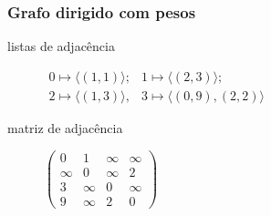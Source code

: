\documentclass{beamer}
\begin{document}
\begin{frame}
\frametitle{Grafo dirigido com pesos}

\begin{center}
\end{center}

\begin{description}

\item[listas de adjacência] $\begin{array}{ll}
  0 \mapsto \langle (1, 1) \rangle; & 1 \mapsto \langle (2, 3) \rangle; \\
  2 \mapsto \langle (1, 3) \rangle, & 3 \mapsto \langle (0, 9), (2, 2) \rangle
  \end{array}$

\item[matriz de adjacência] $\left( 
\begin{array}{cccc}
0 & 1 & \infty & \infty \\
\infty & 0 & \infty & 2 \\
3 & \infty & 0 & \infty \\
9 & \infty & 2 & 0
\end{array}
\right)
$
\end{description}
\end{frame}
\end{document}
